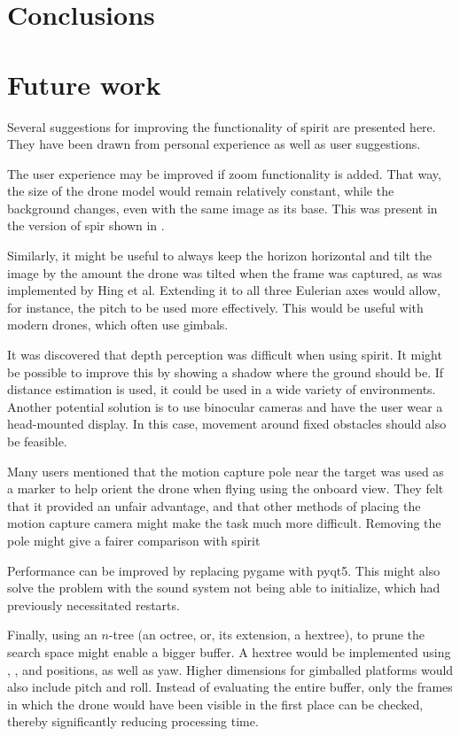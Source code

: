 \chapter{Conclusions}
\label{ch:conclusion}
\chapter{Future work}
Several suggestions for improving the functionality of \gls{spirit} are presented here.
They have been drawn from personal experience as well as user suggestions.

The user experience may be improved if zoom functionality is added.
That way, the size of the drone model would remain relatively constant, while the background changes, even with the same image as its base.
This was present in the version of \gls{spir} shown in \cite{ito2008}.

Similarly, it might be useful to always keep the horizon horizontal and tilt the image by the amount the drone was tilted when the frame was captured, as was implemented by Hing et al.\cite{hing2009}
Extending it to all three Eulerian axes would allow, for instance, the pitch to be used more effectively.
This would be useful with modern drones, which often use gimbals.

It was discovered that depth perception was difficult when using \gls{spirit}.
It might be possible to improve this by showing a shadow where the ground should be.
If distance estimation is used, it could be used in a wide variety of environments.
Another potential solution is to use binocular cameras and have the user wear a head-mounted display.
In this case, movement around fixed obstacles should also be feasible.

Many users mentioned that the motion capture pole near the target was used as a marker to help orient the drone when flying using the onboard view.
They felt that it provided an unfair advantage, and that other methods of placing the motion capture camera might make the task much more difficult.
Removing the pole might give a fairer comparison with \gls{spirit}

Performance can be improved by replacing \gls{pygame} with \gls{pyqt5}.
This might also solve the problem with the sound system not being able to initialize, which had previously necessitated restarts.

Finally, using an $n$-tree (an octree, or, its extension, a hextree), to prune the search space might enable a bigger buffer.
A hextree would be implemented using , , and  positions, as well as yaw.
Higher dimensions for gimballed platforms would also include pitch and roll.
Instead of evaluating the entire buffer, only the frames in which the drone would have been visible in the first place can be checked, thereby significantly reducing processing time.
